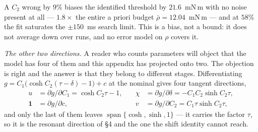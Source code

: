 \documentclass[11pt]{article}
\newcommand{\rbar}{\bar\rho}
\begin{document}
A $C_2$ wrong by $9\%$ biases the identified threshold by $21.6$~mN\,m
with no noise present at all --- $1.8\times$ the entire a priori budget
$\rbar = 12.04$~mN\,m --- and at $58\%$ the fit saturates the $\pm150$~ms
search limit. This is a bias, not a bound: it does not average down over
runs, and no error model on $\rho$ covers it.

\emph{The other two directions.} A reader who counts parameters will
object that the model has four of them and this appendix has projected
onto two. The objection is right and the answer is that they belong to
different stages. Differentiating
$g = C_1\bigl(\cosh C_2(\tau-\delta)-1\bigr)+c$ at the nominal gives
four tangent directions,
\begin{equation}
\begin{aligned}
  u &= \partial g/\partial C_1 = \cosh C_2\tau - 1, &\quad
  \chi &= \partial g/\partial\delta = -C_1C_2\sinh C_2\tau, \\
  \mathbf{1} &= \partial g/\partial c, &\quad
  v &= \partial g/\partial C_2 = C_1\tau\sinh C_2\tau ,
\end{aligned}
  \tag{D.15a}
\end{equation}
and only the last of them leaves $\operatorname{span}\{\cosh,\sinh,1\}$
--- it carries the factor $\tau$, so it is the resonant direction of
\S4 and the one the shift identity cannot reach.
\end{document}
